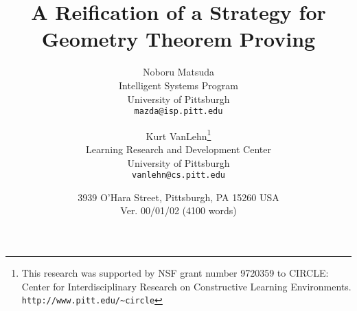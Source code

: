 \documentclass[11pt]{article}
\title{
  \bfseries A Reification of a Strategy for Geometry Theorem Proving
  }
\author{
  Noboru Matsuda \\
  Intelligent Systems Program \\
  University of Pittsburgh \\
  \texttt{mazda@isp.pitt.edu}
  \and
  Kurt VanLehn\thanks{This research was supported by NSF grant number
  9720359 to CIRCLE: Center
  for Interdisciplinary Research on Constructive Learning
  Environments. \texttt{http://www.pitt.edu/\~{}circle} } \\
  Learning Research and Development Center \\
  University of Pittsburgh\\
  \texttt{vanlehn@cs.pitt.edu}
  }
\date{
  3939 O'Hara Street, Pittsburgh, PA 15260 USA\\
  Ver. 00/01/02 (4100 words)
  }
\begin{document}
\maketitle

\begin{abstract}
 
\end{abstract}









\end{document}
